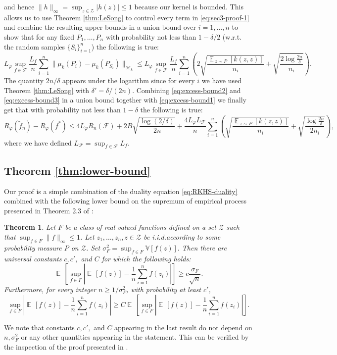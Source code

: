 \documentclass{article}
\newtheorem{theorem}{Theorem}
\DeclareMathOperator*{\E}{\mathbb{E}\,}
\renewcommand{\H}{\mathcal{H}}
\newcommand{\F}{\mathcal{F}}
\newcommand{\Z}{\mathcal{Z}}
\newcommand{\Rp}{R_{\varphi}}
\newcommand{\f}{f^*}
\newcommand{\fnt}{\tilde{f}_n}
\begin{document}
and hence $\|h\|_{\infty} = \sup_{z\in\Z}|h(z)| \leq 1$ because our kernel is
bounded.  This allows us to use Theorem \ref{thm:LeSong} to control every term
in \eqref{eq:sec3-proof-1} and combine the resulting upper bounds in a union
bound over $i=1,\dots,n$ to show that for any fixed $P_1,\dots,P_n$ with
probability not less than $1-\delta/2$ (w.r.t. the random samples
$\{S_i\}_{i=1}^n$) the following is true:
\begin{equation}
\label{eq:excess-bound3}
L_\varphi\sup_{f\in \F}
\frac{L_f}{n}
\sum_{i=1}^n
\|
\mu_k(P_i) - \mu_k(P_{S_i})
\|_{\H_k}
\leq
L_\varphi\sup_{f\in \F}
\frac{L_f}{n}
\sum_{i=1}^n
\left(
2\sqrt{\frac{\E_{z\sim P}[k(z,z)]}{n_i}} + \sqrt{\frac{2\log\frac{2n}{\delta}}{n_i}}
\right).
\end{equation}
The quantity $2n/\delta$ appears under the logarithm since for every $i$ we
have used Theorem \ref{thm:LeSong} with $\delta' = \delta / (2n)$.  Combining
\eqref{eq:excess-bound2} and \eqref{eq:excess-bound3} in a union bound together
with \eqref{eq:excess-bound1} we finally get that with probability not less
than $1-\delta$ the following is true:
\[
\Rp(\fnt) - \Rp(\f)
\leq
4 L_\varphi R_n(\F) + 2B\sqrt{\frac{\log(2/\delta)}{2n}}
+
\frac{4L_\varphi L_{\F}}{n}
\sum_{i=1}^n
\left(
\sqrt{\frac{\E_{z\sim P}[k(z,z)]}{n_i}} + \sqrt{\frac{\log\frac{2n}{\delta}}{2n_i}}
\right),
\]
where we have defined $L_{\F} = \sup_{f\in\F}L_f$.

\subsection{Theorem \ref{thm:lower-bound}}
\label{sect:ProofLowerBound}
Our proof is a simple combination of the duality equation
\eqref{eq:RKHS-duality} combined with the following lower bound on the supremum
of empirical process presented in Theorem 2.3 of \cite{BM06}:
\begin{theorem}
\label{thm:BM06}
Let $F$ be a class of real-valued functions defined on a set $\Z$ such that
$\sup_{f\in F}\|f\|_{\infty}\leq 1$.  Let $z_1,\dots,z_n,z\in\Z$ be
i.i.d.\:according to some probability measure $P$ on $\Z$.  Set $\sigma^2_F =
\sup_{f\in F} \mathbb{V}[f(z)].$ Then there are universal constants $c,c',$ and
$C$ for which the following holds:
\[
\E\left[\sup_{f\in F}\left|
\E[f(z)]
-
\frac{1}{n}\sum_{i=1}^n f(z_i)
\right|\right]
\geq
c\frac{\sigma_F}{\sqrt{n}}.
\]
Furthermore, for every integer $n\geq 1/\sigma^2_F$, with probability at least $c'$,
\[
\sup_{f\in F}\left|
\E[f(z)]
-
\frac{1}{n}\sum_{i=1}^n f(z_i)
\right|
\geq
C\E\left[\sup_{f\in F}\left|
\E[f(z)]
-
\frac{1}{n}\sum_{i=1}^n f(z_i)
\right|\right].
\]
\end{theorem}
We note that constants $c,c',$ and $C$ appearing in the last result do not
depend on $n,\sigma^2_F$ or any other quantities appearing in the statement.
This can be verified by the inspection of the proof presented in \cite{BM06}.
\end{document}
